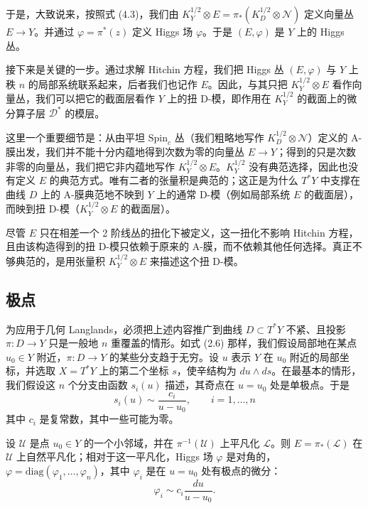 \documentclass[11pt,a4paper]{article}
\begin{document}
于是，大致说来，按照式 (4.3)，我们由 $K_Y^{1/2}\otimes E=\pi_*(K_D^{1/2}\otimes\mathcal{N})$ 定义向量丛 $E\to Y$。并通过 $\varphi=\pi^*(z)$ 定义 Higgs 场 $\varphi$。于是 $(E,\varphi)$ 是 $Y$ 上的 Higgs 丛。

接下来是关键的一步。通过求解 Hitchin 方程，我们把 Higgs 丛 $(E,\varphi)$ 与 $Y$ 上秩 $n$ 的局部系统联系起来，后者我们也记作 $E$。因此，与其只把 $K_Y^{1/2}\otimes E$ 看作向量丛，我们可以把它的截面层看作 $Y$ 上的扭 D-模，即作用在 $K_Y^{1/2}$ 的截面上的微分算子层 $\mathcal{D}^*$ 的模层。

这里一个重要细节是：从由平坦 $\mathrm{Spin}_c$ 丛（我们粗略地写作 $K_D^{1/2}\otimes\mathcal{N}$）定义的 A-膜出发，我们并不能十分内蕴地得到次数为零的向量丛 $E\to Y$；得到的只是次数非零的向量丛，我们把它非内蕴地写作 $K_Y^{1/2}\otimes E$。$K_Y^{1/2}$ 没有典范选择，因此也没有定义 $E$ 的典范方式。唯有二者的张量积是典范的；这正是为什么 $T^*Y$ 中支撑在曲线 $D$ 上的 A-膜典范地不映到 $Y$ 上的通常 D-模（例如局部系统 $E$ 的截面层），而映到扭 D-模（$K_Y^{1/2}\otimes E$ 的截面层）。


尽管 $E$ 只在相差一个 2 阶线丛的扭化下被定义，这一扭化不影响 Hitchin 方程，且由该构造得到的扭 D-模只依赖于原来的 A-膜，而不依赖其他任何选择。真正不够典范的，是用张量积 $K_Y^{1/2}\otimes E$ 来描述这个扭 D-模。

\subsection{极点}

为应用于几何 Langlands，必须把上述内容推广到曲线 $D\subset T^*Y$ 不紧、且投影 $\pi:D\to Y$ 只是一般地 $n$ 重覆盖的情形。如式 (2.6) 那样，我们假设局部地在某点 $u_0\in Y$ 附近，$\pi:D\to Y$ 的某些分支趋于无穷。设 $u$ 表示 $Y$ 在 $u_0$ 附近的局部坐标，并选取 $X=T^*Y$ 上的第二个坐标 $s$，使辛结构为 $du\wedge ds$。在最基本的情形，我们假设这 $n$ 个分支由函数 $s_i(u)$ 描述，其奇点在 $u=u_0$ 处是单极点。于是
\begin{equation}\tag{4.4}
s_i(u)\sim\frac{c_i}{u-u_0},\qquad i=1,\dots,n
\end{equation}
其中 $c_i$ 是复常数，其中一些可能为零。

设 $\mathcal{U}$ 是点 $u_0\in Y$ 的一个小邻域，并在 $\pi^{-1}(\mathcal{U})$ 上平凡化 $\mathcal{L}$。则 $E=\pi_*(\mathcal{L})$ 在 $\mathcal{U}$ 上自然平凡化；相对于这一平凡化，Higgs 场 $\varphi$ 是对角的，$\varphi=\mathrm{diag}(\varphi_1,\dots,\varphi_n)$，其中 $\varphi_i$ 是在 $u=u_0$ 处有极点的微分：
\begin{equation}\tag{4.5}
\varphi_i\sim c_i\frac{du}{u-u_0}.
\end{equation}
\end{document}
